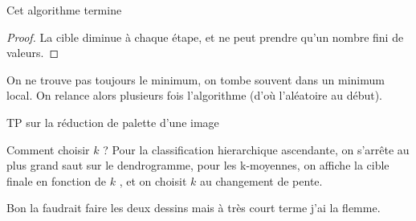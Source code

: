 \begin{proposition}
	Cet algorithme termine
\end{proposition}

\begin{proof}
	La cible diminue à chaque étape, et ne peut prendre qu'un nombre fini de valeurs.
\end{proof}

\begin{rem}
	On ne trouve pas toujours le minimum, on tombe souvent dans un minimum local. On relance alors plusieurs fois l'algorithme (d'où l'aléatoire au début).
\end{rem}

\begin{exercise}
	TP sur la réduction de palette d'une image
\end{exercise}

\begin{rem}
	Comment choisir $k$ ? Pour la classification hierarchique ascendante, on s'arrête au plus grand saut sur le dendrogramme, pour les k-moyennes, on affiche la cible finale en fonction de $k$ , et on choisit $k$ au changement de pente.
\end{rem}

\begin{com}
	Bon la faudrait faire les deux dessins mais à très court terme j'ai la flemme.
\end{com}
